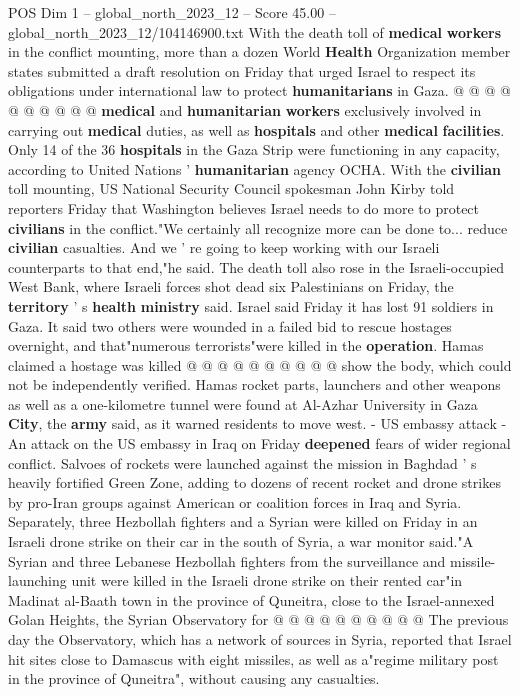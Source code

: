 \begin{textsample}{POS Dim 1 – global\_north\_2023\_12 – Score 45.00 – global\_north\_2023\_12/104146900.txt}
With the death toll of \textbf{medical} \textbf{workers} in the conflict mounting, more than a dozen World \textbf{Health} Organization member states submitted a draft resolution on Friday that urged Israel to respect its obligations under international law to protect \textbf{humanitarians} in Gaza. @ @ @ @ @ @ @ @ @ @ \textbf{medical} and \textbf{humanitarian} \textbf{workers} exclusively involved in carrying out \textbf{medical} duties, as well as \textbf{hospitals} and other \textbf{medical} \textbf{facilities}.
Only 14 of the 36 \textbf{hospitals} in the Gaza Strip were functioning in any capacity, according to United Nations ' \textbf{humanitarian} agency OCHA.
With the \textbf{civilian} toll mounting, US National Security Council spokesman John Kirby told reporters Friday that Washington believes Israel needs to do more to protect \textbf{civilians} in the conflict."We certainly all recognize more can be done to... reduce \textbf{civilian} casualties.
And we ' re going to keep working with our Israeli counterparts to that end,"he said.
The death toll also rose in the Israeli-occupied West Bank, where Israeli forces shot dead six Palestinians on Friday, the \textbf{territory} ' s \textbf{health} \textbf{ministry} said.
Israel said Friday it has lost 91 soldiers in Gaza.
It said two others were wounded in a failed bid to rescue hostages overnight, and that"numerous terrorists"were killed in the \textbf{operation}.
Hamas claimed a hostage was killed @ @ @ @ @ @ @ @ @ @ show the body, which could not be independently verified.
Hamas rocket parts, launchers and other weapons as well as a one-kilometre tunnel were found at Al-Azhar University in Gaza \textbf{City}, the \textbf{army} said, as it warned residents to move west. - US embassy attack - An attack on the US embassy in Iraq on Friday \textbf{deepened} fears of wider regional conflict.
Salvoes of rockets were launched against the mission in Baghdad ' s heavily fortified Green Zone, adding to dozens of recent rocket and drone strikes by pro-Iran groups against American or coalition forces in Iraq and Syria.
Separately, three Hezbollah fighters and a Syrian were killed on Friday in an Israeli drone strike on their car in the south of Syria, a war monitor said."A Syrian and three Lebanese Hezbollah fighters from the surveillance and missile-launching unit were killed in the Israeli drone strike on their rented car"in Madinat al-Baath town in the province of Quneitra, close to the Israel-annexed Golan Heights, the Syrian Observatory for @ @ @ @ @ @ @ @ @ @ The previous day the Observatory, which has a network of sources in Syria, reported that Israel hit sites close to Damascus with eight missiles, as well as a"regime military post in the province of Quneitra", without causing any casualties.

\end{textsample}
